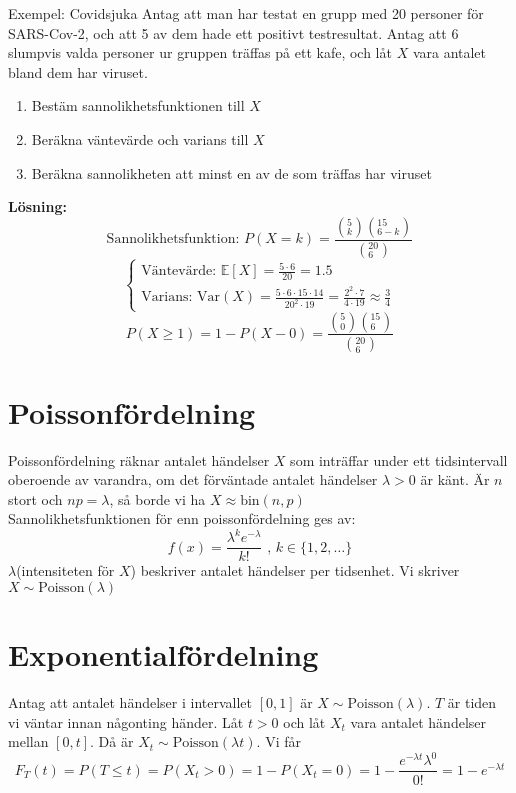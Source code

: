 \begin{exempel}{Exempel: Covidsjuka}
	Antag att man har testat en grupp med 20 personer för SARS-Cov-2, och att 5 av dem hade ett positivt testresultat. Antag att 6 slumpvis valda personer ur gruppen träffas på ett kafe, och låt $X$ vara antalet bland dem har viruset.\begin{enumerate}
		\item Bestäm sannolikhetsfunktionen till $X$
		\item Beräkna väntevärde och varians till $X$
		\item Beräkna sannolikheten att minst en av de som träffas har viruset
	\end{enumerate}
	\textbf{Lösning:}\\
	$$
		\text{Sannolikhetsfunktion: }P(X=k)=\frac{(^5_k)(^{15}_{6-k})}{(^{20}_{6})}
	$$$$
		\begin{cases}
			\text{Väntevärde: }\mathbb{E}[X]=\frac{5\cdot6}{20}=1.5 \\
			\text{Varians: }\text{Var}(X)=\frac{5\cdot6\cdot15\cdot14}{20^2\cdot19}=\frac{2^2\cdot7}{4\cdot19}\approx\frac{3}{4}
		\end{cases}
	$$$$
		P(X\geq1)=1-P(X-0)=\frac{(^5_0)(^{15}_6)}{(^{20}_6)}
	$$
\end{exempel}

\section{Poissonfördelning}
Poissonfördelning räknar antalet händelser $X$ som inträffar under ett tidsintervall oberoende av varandra, om det förväntade antalet händelser $\lambda>0$ är känt. Är $n$ stort och $np=\lambda$, så borde vi ha $X\approx\text{bin}(n,p)$\\
Sannolikhetsfunktionen för enn poissonfördelning ges av:$$
	f(x)=\frac{\lambda^ke^{-\lambda}}{k!}\text{ , }k\in\{1,2,\ldots\}
$$$\lambda$(intensiteten för $X$) beskriver antalet händelser per tidsenhet. Vi skriver $X\sim\text{Poisson}(\lambda)$

\section{Exponentialfördelning}
Antag att antalet händelser i intervallet $[0,1]$ är $X\sim\text{Poisson}(\lambda)$. $T$ är tiden vi väntar innan någonting händer. Låt $t>0$ och låt $X_t$ vara antalet händelser mellan $[0,t]$. Då är $X_t\sim\text{Poisson}(\lambda t)$. Vi får $$
	F_T(t)=P(T\leq t)=P(X_t>0)=1-P(X_t=0)=1-\frac{e^{-\lambda t}\lambda^0}{0!}=1-e^{-\lambda t}
$$
